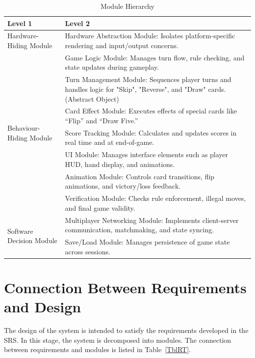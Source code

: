 \documentclass[12pt, titlepage]{article}
\begin{document}
\begin{table}[H]
\centering
\renewcommand{\arraystretch}{1.5}
\begin{tabular}{p{} p{}}
\toprule
\textbf{Level 1} & \textbf{Level 2} \\
\midrule

Hardware-Hiding Module & Hardware Abstraction Module: Isolates platform-specific rendering and input/output concerns. \\
\midrule

\multirow{7}{0.3\textwidth}{Behaviour-Hiding Module}
& Game Logic Module: Manages turn flow, rule checking, and state updates during gameplay. \\
& Turn Management Module: Sequences player turns and handles logic for "Skip", "Reverse", and "Draw" cards. (Abstract Object) \\
& Card Effect Module: Executes effects of special cards like “Flip” and “Draw Five.” \\
& Score Tracking Module: Calculates and updates scores in real time and at end-of-game. \\
& UI Module: Manages interface elements such as player HUD, hand display, and animations. \\
& Animation Module: Controls card transitions, flip animations, and victory/loss feedback. \\
& Verification Module: Checks rule enforcement, illegal moves, and final game validity. \\
\midrule

\multirow{2}{0.3\textwidth}{Software Decision Module}
& Multiplayer Networking Module: Implements client-server communication, matchmaking, and state syncing. \\
& Save/Load Module: Manages persistence of game state across sessions. \\
\bottomrule
\end{tabular}
\caption{Module Hierarchy}
\label{TblMH}
\end{table}

\section{Connection Between Requirements and Design} \label{SecConnection}

The design of the system is intended to satisfy the requirements developed in
the SRS. In this stage, the system is decomposed into modules. The connection
between requirements and modules is listed in Table~\ref{TblRT}.
\end{document}
